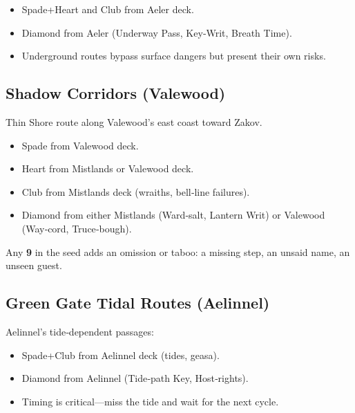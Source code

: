 \begin{itemize}
    \item Spade+Heart and Club from Aeler deck.
    \item Diamond from Aeler (Underway Pass, Key‑Writ, Breath Time).
    \item Underground routes bypass surface dangers but present their own risks.
\end{itemize}

\subsection{Shadow Corridors (Valewood)}\label{subsec:shadow_corridors}

Thin Shore route along Valewood's east coast toward Zakov.

\begin{itemize}
    \item Spade from Valewood deck.
    \item Heart from Mistlands or Valewood deck.
    \item Club from Mistlands deck (wraiths, bell‑line failures).
    \item Diamond from either Mistlands (Ward‑salt, Lantern Writ) or Valewood (Way‑cord, Truce‑bough).
\end{itemize}

\begin{tcolorbox}[title=Rule of 9s, colback=red!5!white, colframe=red!75!black, sharp corners,breakable]
    Any \textbf{9} in the seed adds an omission or taboo: a missing step, an unsaid name, an unseen guest.
\end{tcolorbox}

\subsection{Green Gate Tidal Routes (Aelinnel)}\label{subsec:green_gate}

Aelinnel's tide‑dependent passages:

\begin{itemize}
    \item Spade+Club from Aelinnel deck (tides, geasa).
    \item Diamond from Aelinnel (Tide‑path Key, Host‑rights).
    \item Timing is critical---miss the tide and wait for the next cycle.
\end{itemize}

